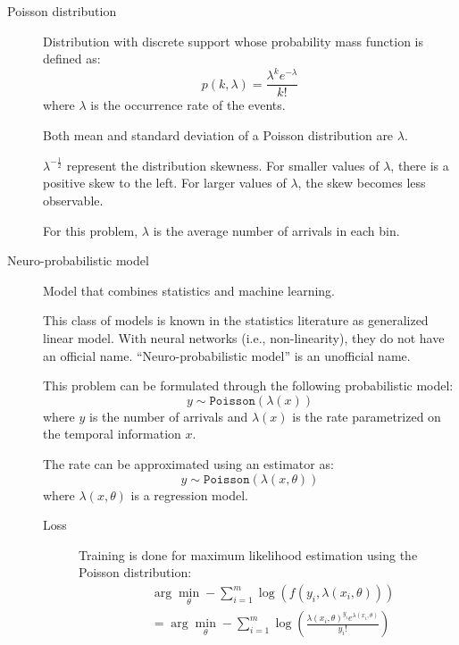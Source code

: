 \begin{description}
    \item[Poisson distribution] 
        Distribution with discrete support whose probability mass function is defined as:
        \[ p(k, \lambda) = \frac{\lambda^k e^{-\lambda}}{k!} \]
        where $\lambda$ is the occurrence rate of the events.

        \begin{remark}
            Both mean and standard deviation of a Poisson distribution are $\lambda$.
        \end{remark}

        \begin{remark}
            $\lambda^{-\frac{1}{2}}$ represent the distribution skewness. For smaller values of $\lambda$, there is a positive skew to the left. For larger values of $\lambda$, the skew becomes less observable.
        \end{remark}

        \begin{remark}
            For this problem, $\lambda$ is the average number of arrivals in each bin.
        \end{remark}

    \item[Neuro-probabilistic model] 
        Model that combines statistics and machine learning.

        \begin{remark}
            This class of models is known in the statistics literature as generalized linear model. With neural networks (i.e., non-linearity), they do not have an official name. ``Neuro-probabilistic model'' is an unofficial name.
        \end{remark}

        This problem can be formulated through the following probabilistic model:
        \[ y \sim \texttt{Poisson}(\lambda(x)) \]
        where $y$ is the number of arrivals and $\lambda(x)$ is the rate parametrized on the temporal information $x$.

        The rate can be approximated using an estimator as:
        \[ y \sim \texttt{Poisson}(\lambda(x, \theta)) \]
        where $\lambda(x, \theta)$ is a regression model.

        \begin{description}
            \item[Loss]
                Training is done for maximum likelihood estimation using the Poisson distribution:
                \[
                    \begin{split}
                        &\arg\min_\theta - \sum_{i=1}^{m} \log\left( f(y_i, \lambda(x_i, \theta)) \right) \\
                        &= \arg\min_\theta - \sum_{i=1}^{m} \log\left( \frac{\lambda(x_i, \theta)^{y_i} e^{\lambda(x_i, \theta)}}{y_i!} \right)
                    \end{split}
                \]


\end{description}
\end{description}
